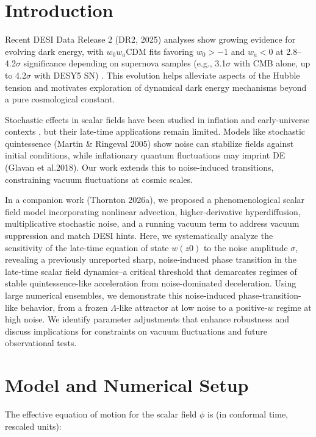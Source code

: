 \documentclass[preprint]{aastex7}
\begin{document}
\section{Introduction}
Recent DESI Data Release 2 (DR2, 2025) analyses show growing evidence for evolving dark energy, with $w_0 w_a$CDM fits favoring \( w_0 > -1 \) and \( w_a < 0 \) at 2.8--4.2\( \sigma \) significance depending on supernova samples (e.g., 3.1\( \sigma \) with CMB alone, up to 4.2\( \sigma \) with DESY5 SN) \citep{DESI2025a,DESI2025b,DESI2025c}. This evolution helps alleviate aspects of the Hubble tension and motivates exploration of dynamical dark energy mechanisms beyond a pure cosmological constant.

Stochastic effects in scalar fields have been studied in inflation and early-universe contexts \citep{Starobinsky1994,Grain2010}, but their late-time applications remain limited. Models like stochastic quintessence (Martin \& Ringeval 2005) show noise can stabilize fields against initial conditions, while inflationary quantum fluctuations may imprint DE (Glavan et al.2018). Our work extends this to noise-induced transitions, constraining vacuum fluctuations at cosmic scales.

In a companion work (Thornton 2026a), we proposed a phenomenological scalar field model incorporating nonlinear advection, higher-derivative hyperdiffusion, multiplicative stochastic noise, and a running vacuum term to address vacuum suppression and match DESI hints. Here, we systematically analyze the sensitivity of the late-time equation of state \( w(z0) \) to the noise amplitude \( \sigma \), revealing a previously unreported sharp, noise-induced phase transition in the late-time scalar field dynamics--a critical threshold that demarcates regimes of stable quintessence-like acceleration from noise-dominated deceleration. Using large numerical ensembles, we demonstrate this noise-induced phase-transition-like behavior, from a frozen \( \Lambda \)-like attractor at low noise to a positive-\( w \) regime at high noise. We identify parameter adjustments that enhance robustness and discuss implications for constraints on vacuum fluctuations and future observational tests.

\section{Model and Numerical Setup}

The effective equation of motion for the scalar field \( \phi \) is (in conformal time, rescaled units):
\end{document}
